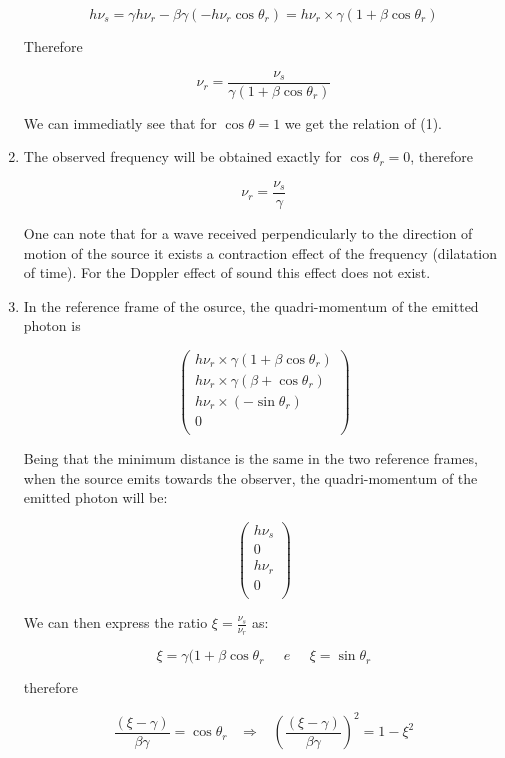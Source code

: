 \begin{solution}
\begin{enumerate}
  $$ h\nu_s = \gamma h\nu_r - \beta \gamma (- h\nu_r \cos \theta_r) =
  h\nu_r \times \gamma (1+\beta \cos \theta_r) $$

  Therefore

  $$ \nu_r = \frac{\nu_s}{\gamma (1+\beta \cos \theta_r)} $$

  We can immediatly see that for $\cos \theta = 1$ we get the relation of (1).

\item The observed frequency will be obtained exactly for $\cos \theta_r = 0$, therefore

   $$ \nu_r = \frac{\nu_s}{\gamma} $$

  One can note that for a wave received perpendicularly to the direction of motion of the source it exists a contraction effect of the frequency (dilatation of time). For the Doppler effect of sound this effect does not exist.

\item In the reference frame of the osurce, the quadri-momentum of the emitted photon is 

  $$\begin{pmatrix}
h\nu_r \times \gamma (1+\beta \cos \theta_r) \\
h\nu_r \times \gamma (\beta  + \cos \theta_r) \\
h\nu_r \times (-\sin \theta_r)\\
0\\
\end{pmatrix}$$

Being that the minimum distance is the same in the two reference frames, when the source emits towards the observer, the quadri-momentum of the emitted photon will be:

$$\begin{pmatrix}
  h\nu_s  \\
   0 \\
   h\nu_r\\
  0\\
\end{pmatrix}$$

We can then express the ratio $\xi = \frac{\nu_s}{\nu_r}$ as:

$$ \xi = \gamma (1+\beta \cos \theta_r \; \; \; \; \; e \; \; \; \; \; \xi = \sin \theta_r$$

therefore

$$ \frac{(\xi - \gamma)}{\beta\gamma} = \cos \theta_r \; \; \; \Rightarrow \; \; \; \left ( \frac{(\xi - \gamma)}{\beta\gamma} \right )^2 = 1- \xi^2 $$


\end{enumerate}
\end{solution}
